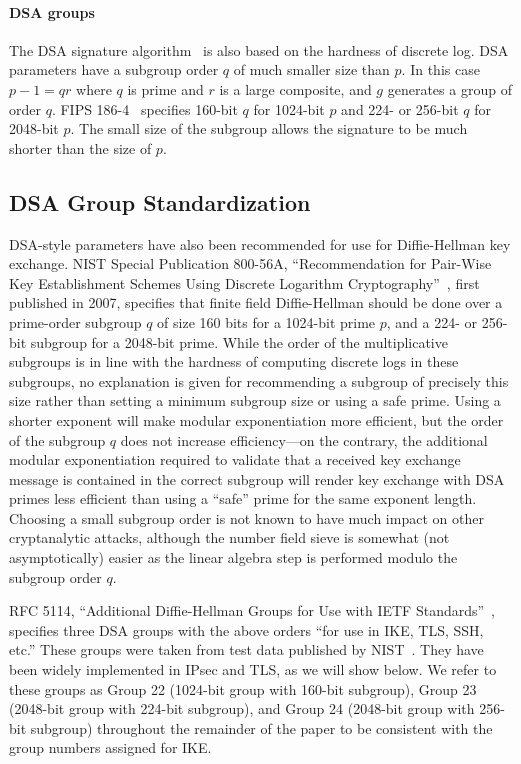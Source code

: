 \paragraph{DSA groups}
The DSA signature algorithm~\cite{fips186} is also based on the hardness of
discrete log.  DSA parameters have a subgroup order $q$ of much smaller size
than $p$.  In this case $p-1 = q r$ where $q$ is prime and $r$ is a large
composite, and $g$ generates a group of order $q$.  FIPS 186-4~\cite{fips186}
specifies 160-bit $q$ for 1024-bit $p$ and 224- or 256-bit $q$ for 2048-bit
$p$.  The small size of the subgroup allows the signature to be much shorter
than the size of $p$.

\subsection{DSA Group Standardization}

DSA-style parameters have also been recommended for use for Diffie-Hellman key
exchange.  NIST Special Publication 800-56A, ``Recommendation for Pair-Wise Key
Establishment Schemes Using Discrete Logarithm
Cryptography''~\cite{sp800}, first published in 2007, specifies that
finite field Diffie-Hellman should be done over a prime-order subgroup $q$ of
size 160 bits for a 1024-bit prime $p$, and a 224- or 256-bit subgroup for a
2048-bit prime.  While the order of the multiplicative subgroups is in line
with the hardness of computing discrete logs in these subgroups, no explanation
is given for recommending a subgroup of precisely this size rather than setting
a minimum subgroup size or using a safe prime.  Using a shorter exponent will
make modular exponentiation more efficient, but the order of the subgroup $q$
does not increase efficiency---on the contrary, the additional modular exponentiation
required to validate that a received key exchange message is contained in the correct
subgroup will render key exchange with DSA primes less efficient than using a ``safe'' 
prime for the same exponent length.  Choosing a small subgroup order is not known to have
much impact on other cryptanalytic attacks, although the number field sieve is
somewhat (not asymptotically) easier as the linear algebra step is performed
modulo the subgroup order $q$.~\cite{logjam-2015}

RFC 5114, ``Additional Diffie-Hellman Groups for Use with IETF
Standards''~\cite{rfc5114}, specifies three DSA groups with the above orders
``for use in IKE, TLS, SSH, etc.''  These groups were taken from test data
published by NIST~\cite{nistffcsamples}. They have been widely implemented in
IPsec and TLS, as we will show below. We refer to these groups as Group 22
(1024-bit group with 160-bit subgroup), Group 23 (2048-bit group with 224-bit
subgroup), and Group 24 (2048-bit group with 256-bit subgroup) throughout the
remainder of the paper to be consistent with the group numbers assigned for
IKE.

